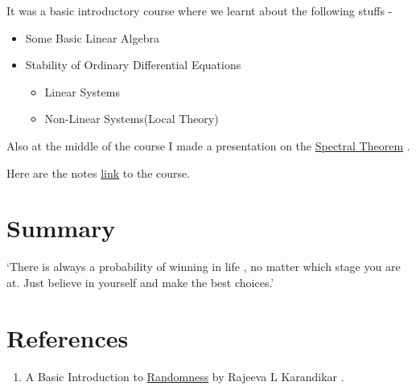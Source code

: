 \documentclass[
  letterpaper,
  DIV=11,
  numbers=noendperiod]{scrreprt}
\providecommand{\tightlist}{%
  \setlength{\itemsep}{0pt}\setlength{\parskip}{0pt}}\usepackage{longtable,booktabs,array}
\newlength{\cslhangindent}
\newenvironment{CSLReferences}[2] %
 {\begin{list}{}{%
  \setlength{\itemindent}{0pt}
  \setlength{\leftmargin}{0pt}
  \setlength{\parsep}{0pt}
  \ifodd #1
   \setlength{\leftmargin}{\cslhangindent}
   \setlength{\itemindent}{-1\cslhangindent}
  \fi
  \setlength{\itemsep}{#2\baselineskip}}}
 {\end{list}}
\begin{document}
\begin{tcolorbox}[enhanced jigsaw, breakable, rightrule=.15mm, opacityback=0, toptitle=1mm, colframe=quarto-callout-note-color-frame, bottomrule=.15mm, toprule=.15mm, leftrule=.75mm, colbacktitle=quarto-callout-note-color!10!white, bottomtitle=1mm, coltitle=black, titlerule=0mm, colback=white, title=\textcolor{quarto-callout-note-color}{\faInfo}\hspace{0.5em}{Introduction to Dynamical Systems(By
\href{https://paulpseudoman.github.io/}{Aritrabha Majumdar})}, left=2mm, arc=.35mm, opacitybacktitle=0.6]

It was a basic introductory course where we learnt about the following
stuffs -

\begin{itemize}
\tightlist
\item
  Some Basic Linear Algebra
\item
  Stability of Ordinary Differential Equations

  \begin{itemize}
  \tightlist
  \item
    Linear Systems
  \item
    Non-Linear Systems(Local Theory)
  \end{itemize}
\end{itemize}

Also at the middle of the course I made a presentation on the
\href{https://drive.google.com/file/d/1bnqrIGg4x6yNU18mimoggvLsltV1oL1Q/view?usp=sharing}{Spectral
Theorem} .

Here are the notes
\href{https://paulpseudoman.github.io/DSnotes.pdf}{link} to the course.

\end{tcolorbox}


\chapter*{Summary}\label{summary}


`There is always a probability of winning in life , no matter which
stage you are at. Just believe in yourself and make the best choices.'


\chapter*{References}\label{references}


\begin{enumerate}
\def\labelenumi{\arabic{enumi}.}
\tightlist
\item
  A Basic Introduction to
  \href{https://www.ias.ac.in/article/fulltext/reso/001/02/0055-0068}{Randomness}
  by Rajeeva L Karandikar .
\end{enumerate}

\label{refs}
\begin{CSLReferences}{0}{1}
\end{CSLReferences}
\end{document}
